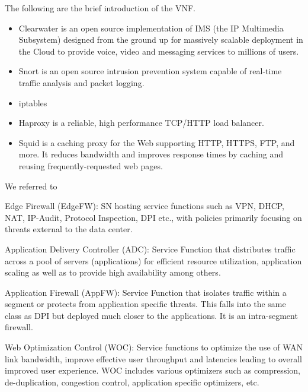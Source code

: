 \documentclass{sig-alternate-10pt}
\begin{document}
The following are the brief introduction of the VNF.
\begin{itemize}
\item{}
Clearwater \cite{noauthor_project_nodate} is an open source implementation of IMS (the IP Multimedia Subsystem) designed from the ground up for massively scalable deployment in the Cloud to provide voice, video and messaging services to millions of users. 

\item{}
Snort \cite{} is an open source intrusion prevention system capable of real-time traffic analysis and packet logging.

\item{}
iptables \cite{}

\item{}
Haproxy \cite{} is a reliable, high performance TCP/HTTP load balancer.

\item{}
Squid \cite{} is a caching proxy for the Web supporting HTTP, HTTPS, FTP, and more. It reduces bandwidth and improves response times by caching and reusing frequently-requested web pages.
\end{itemize}

We referred to \cite{draft-ietf-sfc-dc-use-cases-06}

Edge Firewall (EdgeFW):  SN hosting service functions such as VPN, DHCP, NAT, IP-Audit, Protocol Inspection, DPI etc., with policies primarily focusing on threats external to the data center.

Application Delivery Controller (ADC): Service Function that distributes traffic across a pool of servers (applications) for efficient resource utilization, application scaling as well as to provide high availability among others.
       
Application Firewall (AppFW):  Service Function that isolates traffic within a segment or protects from application specific threats. This falls into the same class as DPI but deployed much closer to the applications. It is an intra-segment firewall.

Web Optimization Control (WOC): Service functions to optimize the use of WAN link bandwidth, improve effective user throughput and latencies leading to overall improved user experience. WOC includes various optimizers such as compression, de-duplication, congestion control, application specific optimizers, etc. %
\end{document}
